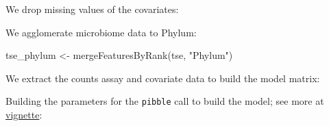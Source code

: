\documentclass[
]{book}
\newenvironment{Shaded}{\begin{snugshade}}{\end{snugshade}}
\newcommand{\AttributeTok}[1]{\textcolor[rgb]{0.77,0.63,0.00}{#1}}
\newcommand{\CommentTok}[1]{\textcolor[rgb]{0.56,0.35,0.01}{\textit{#1}}}
\newcommand{\FunctionTok}[1]{\textcolor[rgb]{0.00,0.00,0.00}{#1}}
\newcommand{\NormalTok}[1]{#1}
\newcommand{\OtherTok}[1]{\textcolor[rgb]{0.56,0.35,0.01}{#1}}
\newcommand{\SpecialCharTok}[1]{\textcolor[rgb]{0.00,0.00,0.00}{#1}}
\newcommand{\StringTok}[1]{\textcolor[rgb]{0.31,0.60,0.02}{#1}}
\begin{document}
We drop missing values of the covariates:

\begin{Shaded}
\end{Shaded}

We agglomerate microbiome data to Phylum:

\begin{Shaded}
\begin{Highlighting}[]
\NormalTok{tse\_phylum }\OtherTok{\textless{}{-}} \FunctionTok{mergeFeaturesByRank}\NormalTok{(tse, }\StringTok{"Phylum"}\NormalTok{)}
\end{Highlighting}
\end{Shaded}

We extract the counts assay and covariate data to build the model
matrix:

\begin{Shaded}
\end{Shaded}

Building the parameters for the \texttt{pibble} call to build the model; see more at \href{https://jsilve24.github.io/fido/articles/introduction-to-fido.html}{vignette}:
\end{document}
